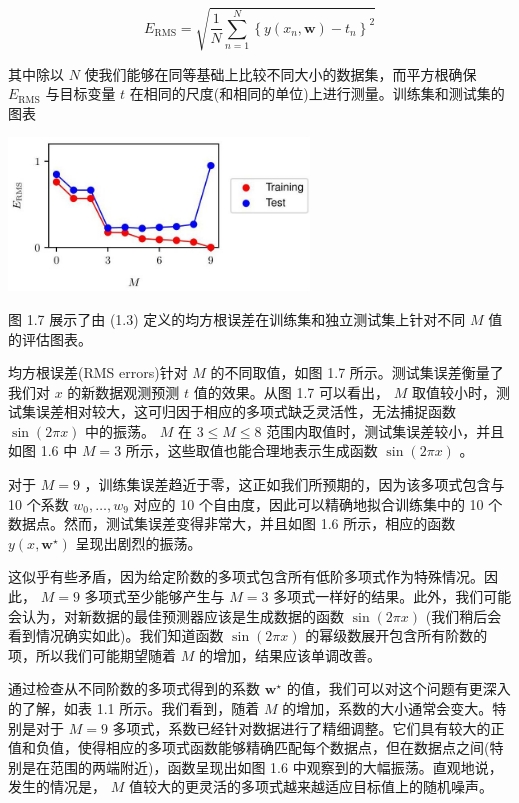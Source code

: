 \documentclass[10pt]{article}
\begin{document}
\[
{E}_{\mathrm{{RMS}}} = \sqrt{\frac{1}{N}\mathop{\sum }\limits_{{n = 1}}^{N}{\left\{  y\left( {x}_{n},\mathbf{w}\right)  - {t}_{n}\right\}  }^{2}} \tag{1.3}
\]

其中除以 \(N\) 使我们能够在同等基础上比较不同大小的数据集，而平方根确保 \({E}_{\mathrm{{RMS}}}\) 与目标变量 \(t\) 在相同的尺度(和相同的单位)上进行测量。训练集和测试集的图表

\begin{center}
\includegraphics[max width=0.6\textwidth]{images/0194e279-9b28-703a-88f4-c3ac21e2010d_30_794_342_754_384_0.jpg}
\end{center}
\hspace*{3em} 

图 1.7 展示了由 (1.3) 定义的均方根误差在训练集和独立测试集上针对不同 \(M\) 值的评估图表。

均方根误差(RMS errors)针对 \(M\) 的不同取值，如图 1.7 所示。测试集误差衡量了我们对 \(x\) 的新数据观测预测 \(t\) 值的效果。从图 1.7 可以看出， \(M\) 取值较小时，测试集误差相对较大，这可归因于相应的多项式缺乏灵活性，无法捕捉函数 \(\sin \left( {2\pi x}\right)\) 中的振荡。 \(M\) 在 \(3 \leq  M \leq  8\) 范围内取值时，测试集误差较小，并且如图 1.6 中 \(M = 3\) 所示，这些取值也能合理地表示生成函数 \(\sin \left( {2\pi x}\right)\) 。

对于 \(M = 9\) ，训练集误差趋近于零，这正如我们所预期的，因为该多项式包含与 10 个系数 \({w}_{0},\ldots ,{w}_{9}\) 对应的 10 个自由度，因此可以精确地拟合训练集中的 10 个数据点。然而，测试集误差变得非常大，并且如图 1.6 所示，相应的函数 \(y\left( {x,{\mathbf{w}}^{ \star  }}\right)\) 呈现出剧烈的振荡。

这似乎有些矛盾，因为给定阶数的多项式包含所有低阶多项式作为特殊情况。因此， \(M = 9\) 多项式至少能够产生与 \(M = 3\) 多项式一样好的结果。此外，我们可能会认为，对新数据的最佳预测器应该是生成数据的函数 \(\sin \left( {2\pi x}\right)\) (我们稍后会看到情况确实如此)。我们知道函数 \(\sin \left( {2\pi x}\right)\) 的幂级数展开包含所有阶数的项，所以我们可能期望随着 \(M\) 的增加，结果应该单调改善。

通过检查从不同阶数的多项式得到的系数 \({\mathbf{w}}^{ \star  }\) 的值，我们可以对这个问题有更深入的了解，如表 1.1 所示。我们看到，随着 \(M\) 的增加，系数的大小通常会变大。特别是对于 \(M = 9\) 多项式，系数已经针对数据进行了精细调整。它们具有较大的正值和负值，使得相应的多项式函数能够精确匹配每个数据点，但在数据点之间(特别是在范围的两端附近)，函数呈现出如图 1.6 中观察到的大幅振荡。直观地说，发生的情况是， \(M\) 值较大的更灵活的多项式越来越适应目标值上的随机噪声。
\end{document}

